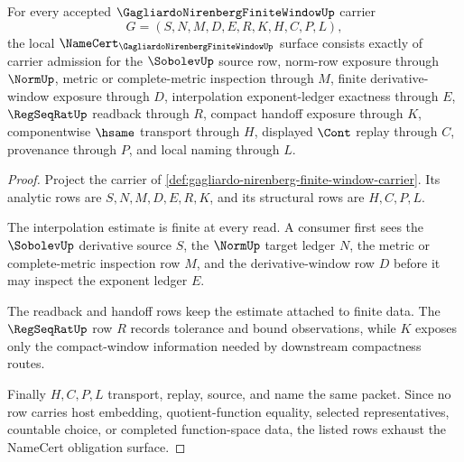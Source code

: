 \begin{theorem}
\label{thm:gagliardo-nirenberg-finite-window-namecert-obligations}
For every accepted $\GagliardoNirenbergFiniteWindowUp$ carrier
$$
G=(S,N,M,D,E,R,K,H,C,P,L),
$$
the local $\NameCert_{\GagliardoNirenbergFiniteWindowUp}$ surface consists exactly of carrier admission for the $\SobolevUp$ source row, norm-row exposure through $\NormUp$, metric or complete-metric inspection through $M$, finite derivative-window exposure through $D$, interpolation exponent-ledger exactness through $E$, $\RegSeqRatUp$ readback through $R$, compact handoff exposure through $K$, componentwise $\hsame$ transport through $H$, displayed $\Cont$ replay through $C$, provenance through $P$, and local naming through $L$.
\end{theorem}
\begin{proof}
Project the carrier of \autoref{def:gagliardo-nirenberg-finite-window-carrier}. Its analytic rows are $S,N,M,D,E,R,K$, and its structural rows are $H,C,P,L$.

The interpolation estimate is finite at every read. A consumer first sees the $\SobolevUp$ derivative source $S$, the $\NormUp$ target ledger $N$, the metric or complete-metric inspection row $M$, and the derivative-window row $D$ before it may inspect the exponent ledger $E$.

The readback and handoff rows keep the estimate attached to finite data. The $\RegSeqRatUp$ row $R$ records tolerance and bound observations, while $K$ exposes only the compact-window information needed by downstream compactness routes.

Finally $H,C,P,L$ transport, replay, source, and name the same packet. Since no row carries host embedding, quotient-function equality, selected representatives, countable choice, or completed function-space data, the listed rows exhaust the NameCert obligation surface.
\end{proof}

